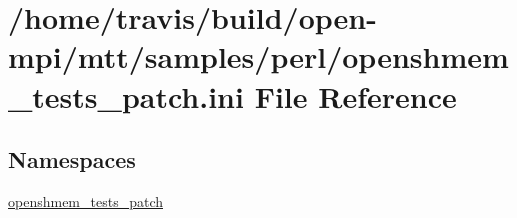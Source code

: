 \hypertarget{openshmem__tests__patch_8ini}{\section{/home/travis/build/open-\/mpi/mtt/samples/perl/openshmem\-\_\-tests\-\_\-patch.ini File Reference}
\label{openshmem__tests__patch_8ini}
}
\subsection*{Namespaces}
\begin{DoxyCompactItemize}
\item 
\hyperlink{namespaceopenshmem__tests__patch}{openshmem\-\_\-tests\-\_\-patch}
\end{DoxyCompactItemize}
